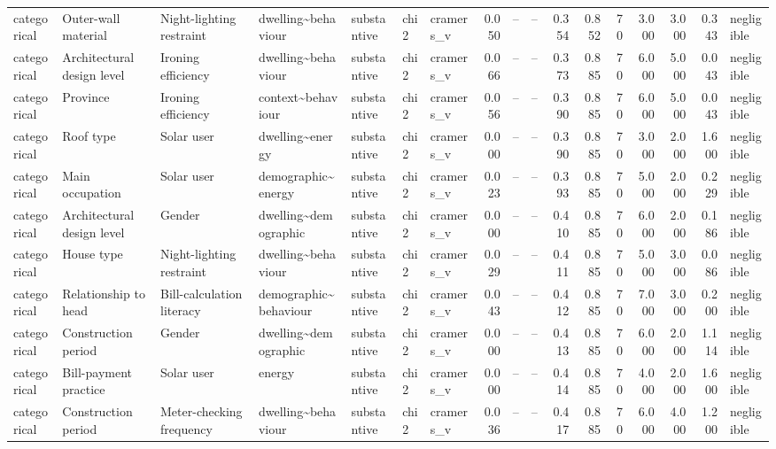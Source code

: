 \begin{table}
\begin{tabular}{lllllllrrrrrrrrrl}
categorical & Outer-wall material & Night-lighting restraint & dwelling\textasciitilde behaviour & substantive & chi2 & cramers\_v & 0.050 & -- & -- & 0.354 & 0.852 & 70 & 3.000 & 3.000 & 0.343 & negligible \\
categorical & Architectural design level & Ironing efficiency & dwelling\textasciitilde behaviour & substantive & chi2 & cramers\_v & 0.066 & -- & -- & 0.373 & 0.885 & 70 & 6.000 & 5.000 & 0.043 & negligible \\
categorical & Province & Ironing efficiency & context\textasciitilde behaviour & substantive & chi2 & cramers\_v & 0.056 & -- & -- & 0.390 & 0.885 & 70 & 6.000 & 5.000 & 0.043 & negligible \\
categorical & Roof type & Solar user & dwelling\textasciitilde energy & substantive & chi2 & cramers\_v & 0.000 & -- & -- & 0.390 & 0.885 & 70 & 3.000 & 2.000 & 1.600 & negligible \\
categorical & Main occupation & Solar user & demographic\textasciitilde energy & substantive & chi2 & cramers\_v & 0.023 & -- & -- & 0.393 & 0.885 & 70 & 5.000 & 2.000 & 0.229 & negligible \\
categorical & Architectural design level & Gender & dwelling\textasciitilde demographic & substantive & chi2 & cramers\_v & 0.000 & -- & -- & 0.410 & 0.885 & 70 & 6.000 & 2.000 & 0.186 & negligible \\
categorical & House type & Night-lighting restraint & dwelling\textasciitilde behaviour & substantive & chi2 & cramers\_v & 0.029 & -- & -- & 0.411 & 0.885 & 70 & 5.000 & 3.000 & 0.086 & negligible \\
categorical & Relationship to head & Bill-calculation literacy & demographic\textasciitilde behaviour & substantive & chi2 & cramers\_v & 0.043 & -- & -- & 0.412 & 0.885 & 70 & 7.000 & 3.000 & 0.200 & negligible \\
categorical & Construction period & Gender & dwelling\textasciitilde demographic & substantive & chi2 & cramers\_v & 0.000 & -- & -- & 0.413 & 0.885 & 70 & 6.000 & 2.000 & 1.114 & negligible \\
categorical & Bill-payment practice & Solar user & energy & substantive & chi2 & cramers\_v & 0.000 & -- & -- & 0.414 & 0.885 & 70 & 4.000 & 2.000 & 1.600 & negligible \\
categorical & Construction period & Meter-checking frequency & dwelling\textasciitilde behaviour & substantive & chi2 & cramers\_v & 0.036 & -- & -- & 0.417 & 0.885 & 70 & 6.000 & 4.000 & 1.200 & negligible \\

\end{tabular}
\end{table}
